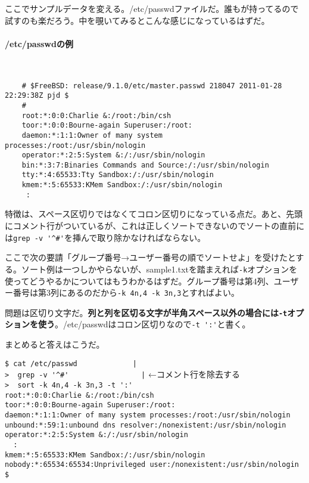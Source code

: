 ここでサンプルデータを変える。/etc/passwdファイルだ。誰もが持ってるので試すのも楽だろう。中を覗いてみるとこんな感じになっているはずだ。

\paragraph*{/etc/passwdの例}　\\
\begin{frameboxit}{160.0mm}
\begin{verbatim}
	# $FreeBSD: release/9.1.0/etc/master.passwd 218047 2011-01-28 22:29:38Z pjd $
	#
	root:*:0:0:Charlie &:/root:/bin/csh
	toor:*:0:0:Bourne-again Superuser:/root:
	daemon:*:1:1:Owner of many system processes:/root:/usr/sbin/nologin
	operator:*:2:5:System &:/:/usr/sbin/nologin
	bin:*:3:7:Binaries Commands and Source:/:/usr/sbin/nologin
	tty:*:4:65533:Tty Sandbox:/:/usr/sbin/nologin
	kmem:*:5:65533:KMem Sandbox:/:/usr/sbin/nologin
	 :
\end{verbatim}
\end{frameboxit}

特徴は、スペース区切りではなくてコロン区切りになっている点だ。あと、先頭にコメント行がついているが、これは正しくソートできないのでソートの直前には\verb|grep -v '^#'|を挿んで取り除かなければならない。

ここで次の要請「グループ番号→ユーザー番号の順でソートせよ」を受けたとする。ソート例は一つしかやらないが、sample1.txtを踏まえれば\verb|-k|オプションを使ってどうやるかについてはもうわかるはずだ。グループ番号は第4列、ユーザー番号は第3列にあるのだから\verb|-k 4n,4 -k 3n,3|とすればよい。

問題は区切り文字だ。\textbf{列と列を区切る文字が半角スペース以外の場合には\verb|-t|オプションを使う}。/etc/passwdはコロン区切りなので\verb|-t ':'|と書く。

まとめると答えはこうだ。

\begin{screen}
	\verb!$ cat /etc/passwd             |! \return \\
	\verb!>  grep -v '^#'                 |! \return   ←コメント行を除去する \\
	\verb!>  sort -k 4n,4 -k 3n,3 -t ':'! \return \\
	\verb!root:*:0:0:Charlie &:/root:/bin/csh! \\
	\verb!toor:*:0:0:Bourne-again Superuser:/root:! \\
	\verb!daemon:*:1:1:Owner of many system processes:/root:/usr/sbin/nologin! \\
	\verb!unbound:*:59:1:unbound dns resolver:/nonexistent:/usr/sbin/nologin! \\
	\verb!operator:*:2:5:System &:/:/usr/sbin/nologin! \\
	\verb!  :! \\
	\verb!kmem:*:5:65533:KMem Sandbox:/:/usr/sbin/nologin! \\
	\verb!nobody:*:65534:65534:Unprivileged user:/nonexistent:/usr/sbin/nologin! \\
	\verb!$ !
\end{screen}

